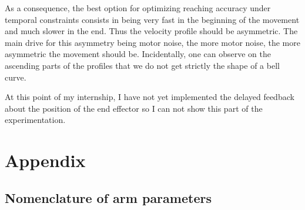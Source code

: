 \documentclass[pdftex,a4paper,11pt]{report}
\begin{document}
As a consequence, the best option for optimizing reaching accuracy under
temporal constraints consists in being very fast in the beginning of the movement
and much slower in the end. Thus the velocity profile should be asymmetric. The main drive
for this asymmetry being motor noise, the more motor noise, the more asymmetric the movement should be.
Incidentally, one can observe on the ascending parts of the profiles that we do not get strictly the shape of a bell curve.

At this point of my internship, I have not yet implemented the delayed feedback about the position of the end effector so I can not show this part of the experimentation.

\chapter{Appendix}
\section{Nomenclature of arm parameters}
\label{sec:params}
\end{document}
